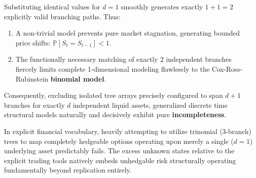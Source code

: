 Substituting identical values for $d=1$ smoothly generates exactly $1+1=2$ explicitly valid branching paths. Thus:
\begin{enumerate}
    \item A non-trivial model prevents pure market stagnation, generating bounded price shifts: $\mathbb{P}[S_t = S_{t-1}] < 1$.
    \item The functionally necessary matching of exactly $2$ independent branches fiercely limits complete 1-dimensional modeling flawlessly to the Cox-Ross-Rubinstein \textbf{binomial model}.
\end{enumerate}

\begin{corollary}
    Consequently, excluding isolated tree arrays precisely configured to span $d+1$ branches for exactly $d$ independent liquid assets, generalized discrete time structural models naturally and decisively exhibit pure \textbf{incompleteness}.
\end{corollary}

In explicit financial vocabulary, heavily attempting to utilize trinomial (3-branch) trees to map completely hedgeable options operating upon merely a single ($d=1$) underlying asset predictably fails. The excess unknown states relative to the explicit trading tools natively embeds unhedgable risk structurally operating fundamentally beyond replication entirely.
